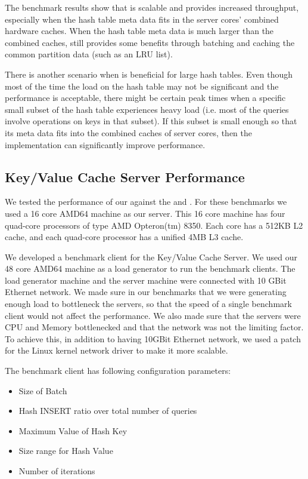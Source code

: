 The benchmark results show that \cphash{} is scalable and provides increased throughput, especially when the hash table meta data fits in the server cores'
combined hardware caches. When the hash table meta data is much larger than the combined caches, \cphash{} still provides some benefits through batching and caching 
the common partition data (such as an LRU list).

There is another scenario when \cphash{} is beneficial for large hash tables. Even though most of the time the load on the hash table may not be significant
and the performance is acceptable, there might be certain peak times when a specific small subset of the hash table experiences heavy load (i.e. most of the queries involve 
operations on keys in that subset). If this subset is small enough so that its meta data fits into the combined caches of server cores, then the \cphash{} 
implementation can significantly improve performance.

\subsection{Key/Value Cache Server Performance}
\label{sec:mcserverbench} 

We tested the performance of our \cpserver{} against the \lockserver{} and \memcached{}. For these benchmarks we used a 16 core AMD64 machine as 
our server. This 16 core machine has four quad-core processors of type AMD Opteron(tm) 8350. Each core has a 512KB L2 cache, and each quad-core processor has a 
unified 4MB L3 cache. 

We developed a benchmark client for the Key/Value Cache Server. We used our 48 core AMD64 machine as a load generator to run the benchmark clients. 
The load generator machine and the server machine were connected with 10 GBit Ethernet network. We made sure in our benchmarks that we were generating enough load to 
bottleneck the servers, so that the speed of a single benchmark client would not affect the performance. We also made sure that the servers were CPU and Memory 
bottlenecked and that the network was not the limiting factor. To achieve this, in addition to having 10GBit Ethernet network, we used a 
patch for the Linux kernel network driver \cite{mosbench} to make it more scalable.

The benchmark client has following configuration parameters:
\begin{itemize}
\item Size of Batch
\item Hash INSERT ratio over total number of queries
\item Maximum Value of Hash Key
\item Size range for Hash Value
\item Number of iterations
\end{itemize}


